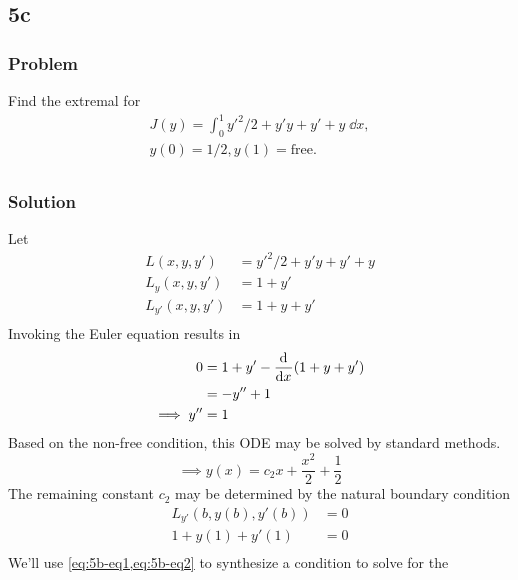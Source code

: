 \documentclass[12pt,twoside]{article}
\begin{document}
\subsection{5c}
\subsubsection*{Problem}
Find the extremal for
\begin{equation}
  \label{eq:5b-problem}
  \begin{aligned}
    J(y) = \int_0^1 y'^2/2+y'y+y'+y\;\dd{x}, \\
    y(0)=1/2, y(1)=\text{free}. \\
  \end{aligned}
\end{equation}

\subsubsection*{Solution}
Let
\begin{align*}
  L(x,y,y') &= y'^2/2+y'y+y'+y \\
  L_y(x,y,y') &= 1 + y' \\
  L_{y'}(x,y,y') &= 1 + y + y' \\
\end{align*}
Invoking the Euler equation results in
\begin{equation}
\label{eq:5b-ode}
\begin{aligned}
  0 &= 1 + y' - \frac{\mathrm{d}^{} {}}{\mathrm{d}{x}^{}}(1 + y + y') \\
  &= -y''+1 \\
  \implies y'' &= 1 \\
\end{aligned}
\end{equation}
Based on the non-free condition, this ODE may be solved by standard methods.
\begin{equation}
  \label{eq:5b-eq1}
  \implies y(x) = c_2 x+\frac{x^2}{2}+\frac{1}{2}
\end{equation}
The remaining constant $c_2$ may be determined by the natural boundary condition
\begin{equation}
  \label{eq:5b-eq2}
  \begin{aligned}
    L_{y'}(b,y(b),y'(b)) &= 0 \\
    1 + y(1) + y'(1) &= 0 \\
  \end{aligned}
\end{equation}
We'll use \cref{eq:5b-eq1,eq:5b-eq2} to synthesize a condition to solve for the
\end{document}
